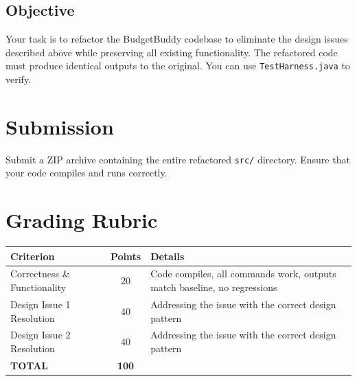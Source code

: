 \documentclass[10pt]{article}
\begin{document}
\subsection{Objective}

Your task is to refactor the BudgetBuddy codebase to eliminate the design issues described above while preserving all existing functionality.
The refactored code must produce identical outputs to the original. You can use \texttt{TestHarness.java} to verify.

\section{Submission}
Submit a ZIP archive containing the entire refactored \texttt{src/} directory. Ensure that your code compiles and runs correctly.

\section{Grading Rubric}

\begin{tabular}{|p{6cm}|c|p{6cm}|}
  \hline
  \textbf{Criterion} & \textbf{Points} & \textbf{Details} \\
  \hline
  Correctness \& Functionality & 20 & Code compiles, all commands work, outputs match baseline, no regressions \\
  \hline
  Design Issue 1 Resolution & 40 &  Addressing the issue with the correct design pattern \\
  \hline
  Design Issue 2 Resolution & 40 & Addressing the issue with the correct design pattern \\
  \hline
  \textbf{TOTAL} & \textbf{100} & \\
  \hline
\end{tabular}

\vspace{1em}
\end{document}
